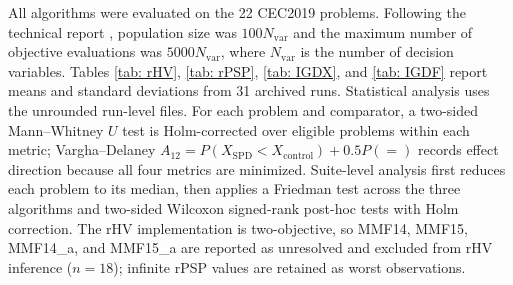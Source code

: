 \par All algorithms were evaluated on the 22 CEC2019 problems. Following the technical report \cite{liang2019problem}, population size was $100N_{\mathrm{var}}$ and the maximum number of objective evaluations was $5000N_{\mathrm{var}}$, where $N_{\mathrm{var}}$ is the number of decision variables. Tables \ref{tab: rHV}, \ref{tab: rPSP}, \ref{tab: IGDX}, and \ref{tab: IGDF} report means and standard deviations from 31 archived runs. Statistical analysis uses the unrounded run-level files. For each problem and comparator, a two-sided Mann--Whitney $U$ test is Holm-corrected over eligible problems within each metric; Vargha--Delaney $A_{12}=P(X_{\mathrm{SPD}}<X_{\mathrm{control}})+0.5P(=)$ records effect direction because all four metrics are minimized. Suite-level analysis first reduces each problem to its median, then applies a Friedman test across the three algorithms and two-sided Wilcoxon signed-rank post-hoc tests with Holm correction. The rHV implementation is two-objective, so MMF14, MMF15, MMF14\_a, and MMF15\_a are reported as unresolved and excluded from rHV inference ($n=18$); infinite rPSP values are retained as worst observations.

